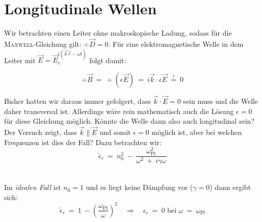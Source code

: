 \newpage
\section{Longitudinale Wellen}

Wir betrachten einen Leiter ohne makroskopische Ladung, sodass für die \textsc{Maxwell}-Gleichung gilt: $\div\vec{D}=0$. Für eine elektromagnetische Welle in dem Leiter mit $\vec{E}=\vec{E}_ e^{i(\vec{k}\vec{r}-\omega t)}$ folgt damit:

\begin{equation*}
\div \vec{B} \ = \ \div(\epsilon\vec{E})  \ = \ i\vec{k}\cdot \epsilon\vec{E} \ \overset{!}{=} \ 0
\end{equation*}

Bisher hatten wir daraus immer gefolgert, dass $\vec{k}\cdot\vec{E}=0$ sein muss und die Welle daher transversal ist. Allerdings wäre rein mathematisch auch die Lösung $\epsilon=0$ für diese Gleichung möglich. Könnte die Welle dann also auch longitudinal sein?\\
Der Versuch zeigt, dass $\vec{k}\parallel\vec{E}$ und somit $\epsilon =0$ möglich ist, aber bei welchen Frequenzen ist dies der Fall? Dazu betrachten wir:\\

\begin{equation*}
\tilde{\epsilon}_r  \ = \ n_0^2 \ - \ \frac{\omega_{\text{Pl}}^2}{\omega^2 \ + \ i \gamma\omega}
\end{equation*}

\ \\
Im \emph{idealen Fall} ist $n_0=1$ und es liegt keine Dämpfung vor ($\gamma=0$) dann ergibt sich:\\

\begin{equation*}
\tilde{\epsilon}_r \ = \ 1 \ - \left(\frac{\omega_{\text{Pl}}}{\omega}\right)^2 \quad\Rightarrow\quad \epsilon_r \ = \ 0 \text{ bei } \omega \ = \ \omega_{\text{Pl}}
\end{equation*}

